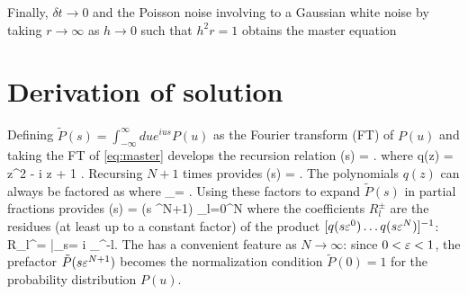 Finally, \DIFdelbegin {}\DIFdelend \DIFaddbegin {}\DIFaddend $\delta t \rightarrow 0$ and \DIFdelbegin {}\DIFdelend \DIFaddbegin {}\DIFaddend the Poisson noise involving \DIFdelbegin {}\DIFdelend \DIFaddbegin {}\DIFaddend to a Gaussian white noise by taking $r \rightarrow \infty$ as $h \rightarrow 0$ such that $h^2 r = 1$ \DIFdelbegin {}\DIFdelend obtains the master equation \DIFdelbegin {}\DIFdelend \DIFaddbegin {}\DIFaddend \section{Derivation of \DIFdelbegin {}\DIFdelend \DIFaddbegin {}\DIFaddend solution}
\label{sec:langsteadyderiv}
Defining $\tilde{P}(s) = \int_{-\infty}^\infty du e^{i u s} P(u) $ as the Fourier transform (FT) of $P(u)$ and taking the FT of \DIFaddbegin {}\DIFaddend \ref{eq:master} develops the recursion relation
\be {}(s) = . \ee
where
\be q(z) =  z^2 - i \tilde{\Gamma} z + 1 . \label{eq:q} \ee
Recursing $N+1$ times provides
\be {}(s) = .\label{eq:recursion}\ee
The polynomials $q(z)$ can always be factored as \DIFdelbegin {}\DIFdelend \DIFaddbegin {}\DIFaddend where
\be \lambda_\pm = . \label{eq:lambdas}\ee
Using these factors to expand $\tilde{P}(s)$ in partial fractions provides
\be {}(s)  = (s \ve^{N+1}) \sum_{l=0}^N   \DIFaddbegin \DIFadd{,}\DIFaddend \ee
where the coefficients $R_l^\pm$ are the residues (at least up to a constant factor) of the product $[q(s\varepsilon^0)\dots q(s\varepsilon^N)]^{-1}$:
\be R_l^\pm =  \Big|_{s= i \lambda_\pm \ve^{-l}}.\ee
The \DIFdelbegin {}\DIFdelend \DIFaddbegin {}\DIFaddend has a convenient feature as $N\rightarrow \infty$: since $0<\varepsilon <1$, the prefactor $\tilde{P}( s \varepsilon^{N+1})$ becomes the normalization condition $\tilde{P}(0)=1$ for the probability distribution $P(u)$\DIFdelbegin {}\DIFdelend .
